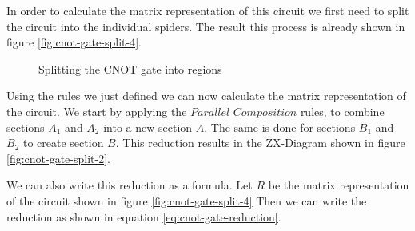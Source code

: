In order to calculate the matrix representation of this circuit we first need to split the circuit into the individual spiders. The result this process is already shown in figure \ref{fig:cnot-gate-split-4}.

\begin{figure}[h]
    \centering
    \qquad
    \caption{Splitting the CNOT gate into regions}
    \label{fig:cnot-gate-split}
\end{figure}

Using the rules we just defined we can now calculate the matrix representation of the circuit. We start by applying the $\textit{Parallel Composition}$ rules, to combine sections $A_1$ and $A_2$ into a new section $A$. The same is done for sections $B_1$ and $B_2$ to create section $B$. This reduction results in the ZX-Diagram shown in figure \ref{fig:cnot-gate-split-2}.


We can also write this reduction as a formula. Let $R$ be the matrix representation of the circuit shown in figure \ref{fig:cnot-gate-split-4} Then we can write the reduction as shown in equation \ref{eq:cnot-gate-reduction}.


